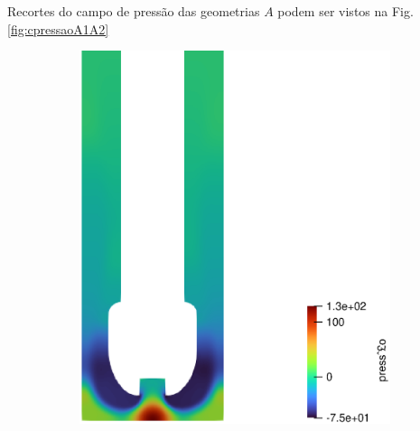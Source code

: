 Recortes do campo de pressão das geometrias $A$ podem ser vistos na Fig. \ref{fig:cpressaoA1A2}
\begin{figure}[H]
        \centering
        \begin{subfigure}[b]{0.42\linewidth}
    		\includegraphics[width=\linewidth]{img/campo_press/liso/campo_de_pres_paraview.eps}
    	\end{subfigure}
    	\begin{subfigure}[b]{0.42\linewidth}

\end{subfigure}
\end{figure}
